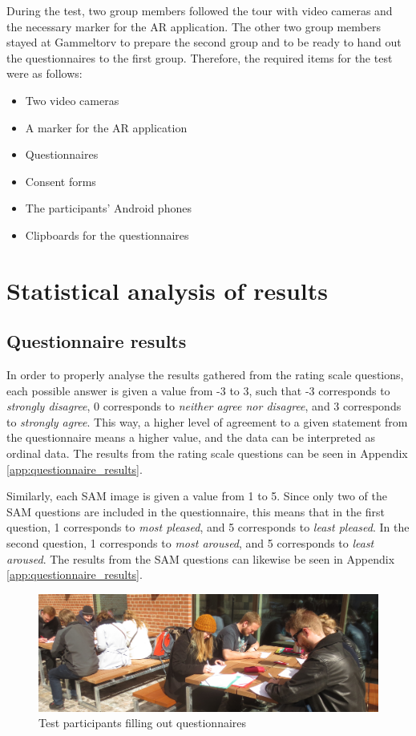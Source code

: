 During the test, two group members followed the tour with video cameras and the necessary marker for the AR application. The other two group members stayed at Gammeltorv to prepare the second group and to be ready to hand out the questionnaires to the first group. Therefore, the required items for the test were as follows:

\begin{itemize}
\item Two video cameras
\item A marker for the AR application
\item Questionnaires
\item Consent forms
\item The participants’ Android phones
\item Clipboards for the questionnaires
\end{itemize}

\section{Statistical analysis of results} 
\subsection{Questionnaire results}
In order to properly analyse the results gathered from the rating scale questions, each possible answer is given a value from -3 to 3, such that -3 corresponds to \textit{strongly disagree}, 0 corresponds to \textit{neither agree nor disagree}, and 3 corresponds to \textit{strongly agree}. This way, a higher level of agreement to a given statement from the questionnaire means a higher value, and the data can be interpreted as ordinal data. The results from the rating scale questions can be seen in Appendix \ref{app:questionnaire_results}.
 
Similarly, each SAM image is given a value from 1 to 5. Since only two of the SAM questions are included in the questionnaire, this means that in the first question, 1 corresponds to \textit{most pleased}, and 5 corresponds to \textit{least pleased}. In the second question, 1 corresponds to \textit{most aroused}, and 5 corresponds to \textit{least aroused}. The results from the SAM questions can likewise be seen in Appendix \ref{app:questionnaire_results}.

\begin{figure}[h!]
   \centering
   \includegraphics[width=\textwidth]{figures/participants_questionnaire.jpg}
   \caption{Test participants filling out questionnaires}\label{fig:participants_questionnaire}
\end{figure}
 
